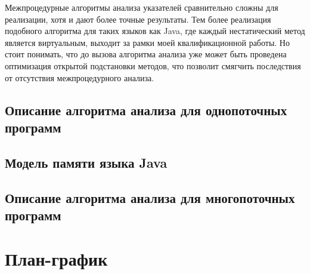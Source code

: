 \documentclass[14pt,titlepage]{extarticle}
\newenvironment{fresh}{\color{Blue}}{\color{black}}
\begin{document}
\begin{fresh}
      Межпроцедурные алгоритмы анализа указателей сравнительно сложны для
      реализации, хотя и дают более точные результаты. Тем более реализация
      подобного алгоритма для таких языков как Java, где каждый нестатический
      метод является виртуальным, выходит за рамки моей квалификационной
      работы. Но стоит понимать, что до вызова алгоритма анализа уже может быть
      проведена оптимизация открытой подстановки методов, что позволит смягчить
      последствия от отсутствия межпроцедурного анализа.

    \subsection{Описание алгоритма анализа для однопоточных программ}

    \subsection{Модель памяти языка Java}

    \subsection{Описание алгоритма анализа для многопоточных программ}

  \end{fresh}

  \newpage
    

  \newpage
  \thispagestyle{empty}
  \pagestyle{empty}
  \section*{План-график}
\end{document}
